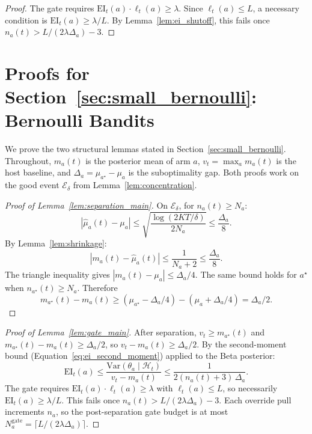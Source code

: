 \documentclass{article}
\newcommand{\Var}{\mathrm{Var}}
\newcommand{\surp}{\ell} %
\newcommand{\EI}{\mathrm{EI}} %
\begin{document}
\begin{proof}
The gate requires $\EI_t(a) \cdot \surp_t(a) \ge \lambda$.
Since $\surp_t(a) \le L$, a necessary condition is $\EI_t(a) \ge \lambda/L$.
By Lemma~\ref{lem:ei_shutoff}, this fails once $n_a(t) > L/(2\lambda\Delta_a) - 3$.
\end{proof}


\section{Proofs for Section~\ref{sec:small_bernoulli}: Bernoulli Bandits}
\label{app:proofs_small}

We prove the two structural lemmas stated in Section~\ref{sec:small_bernoulli}.
Throughout, $m_a(t)$ is the posterior mean of arm $a$, $v_t=\max_a m_a(t)$ is the host baseline, and $\Delta_a=\mu_{a^\star}-\mu_a$ is the suboptimality gap.
Both proofs work on the good event $\mathcal{E}_\delta$ from Lemma~\ref{lem:concentration}.

\begin{proof}[Proof of Lemma~\ref{lem:separation_main}]
On $\mathcal{E}_\delta$, for $n_a(t) \ge N_a$:
\[
|\hat\mu_a(t) - \mu_a|
\le
\sqrt{\frac{\log(2KT/\delta)}{2N_a}}
\le \frac{\Delta_a}{8}.
\]
By Lemma~\ref{lem:shrinkage}:
\[
|m_a(t) - \hat\mu_a(t)| \le \frac{1}{N_a + 2} \le \frac{\Delta_a}{8}.
\]
The triangle inequality gives $|m_a(t) - \mu_a| \le \Delta_a/4$.
The same bound holds for $a^\star$ when $n_{a^\star}(t) \ge N_a$.
Therefore
\[
m_{a^\star}(t) - m_a(t)
\ge (\mu_{a^\star} - \Delta_a/4) - (\mu_a + \Delta_a/4)
= \Delta_a/2.
\]
\end{proof}

\begin{proof}[Proof of Lemma~\ref{lem:gate_main}]
After separation, $v_t \ge m_{a^\star}(t)$ and $m_{a^\star}(t) - m_a(t) \ge \Delta_a/2$, so $v_t - m_a(t) \ge \Delta_a/2$.
By the second-moment bound (Equation~\ref{eq:ei_second_moment}) applied to the Beta posterior:
\[
\EI_t(a)
\le \frac{\Var(\theta_a \mid \mathcal{H}_t)}{v_t - m_a(t)}
\le \frac{1}{2(n_a(t)+3)\,\Delta_a}.
\]
The gate requires $\EI_t(a) \cdot \surp_t(a) \ge \lambda$ with $\surp_t(a) \le L$, so necessarily $\EI_t(a) \ge \lambda/L$.
This fails once $n_a(t) > L/(2\lambda\Delta_a) - 3$.
Each override pull increments $n_a$, so the post-separation gate budget is at most $N_a^{\mathrm{gate}} = \lceil L/(2\lambda\Delta_a)\rceil$.
\end{proof}
\end{document}
